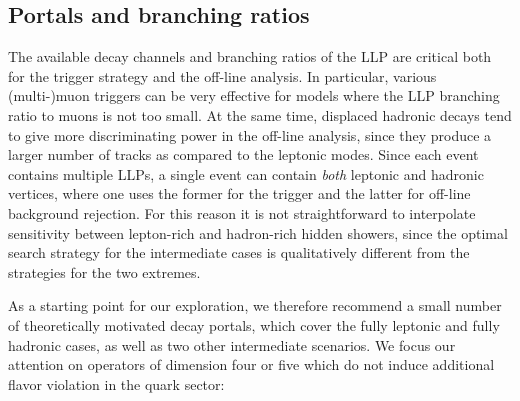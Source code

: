\subsection{Portals and branching ratios}
\label{sec:darkshowerportal}

The available decay channels and branching ratios of the LLP are critical both for the trigger strategy and the off-line analysis. In particular, various (multi-)muon triggers can be very effective for models where the LLP branching ratio to muons is not too small. At the same time, displaced hadronic decays tend to give more discriminating power in the off-line analysis, since they produce a larger number of tracks as compared to the leptonic modes. Since each event contains multiple LLPs, a single event can contain \emph{both} leptonic and hadronic vertices, where one uses the former for the trigger and the latter for off-line background rejection. For this reason it is not straightforward to interpolate sensitivity between lepton-rich and hadron-rich hidden showers, since the optimal search strategy for the intermediate cases is qualitatively different from the strategies for the two extremes.

As a starting point for our exploration, we therefore recommend a small number of theoretically motivated decay portals, which cover the fully leptonic and fully hadronic cases, as well as two other intermediate scenarios. We focus our attention on operators of dimension four or five which do not induce additional flavor violation in the quark sector:

